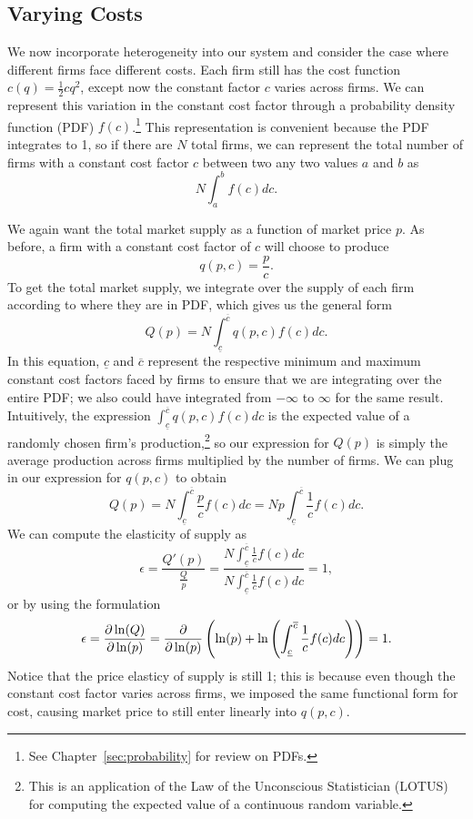 \subsection*{Varying Costs}
We now incorporate heterogeneity into our system and consider the case where different firms face different costs. Each firm still has the cost function $c(q) = \frac{1}{2}cq^2$, except now the constant factor $c$ varies across firms. We can represent this variation in the constant cost factor through a probability density function (PDF) $f(c)$.\footnote{See Chapter~\ref{sec:probability} for review on PDFs.} This representation is convenient because the PDF integrates to 1, so if there are $N$ total firms, we can represent the total number of firms with a constant cost factor $c$ between two any two values $a$ and $b$ as
$$N\int_a^b f(c)dc.$$

We again want the total market supply as a function of market price $p$. As before, a firm with a constant cost factor of $c$ will choose to produce
$$q(p, c) = \frac{p}{c}.$$
To get the total market supply, we integrate over the supply of each firm according to where they are in PDF, which gives us the general form 
$$Q(p) = N\int_{\underline{c}}^{\overline{c}} q(p, c)f(c)dc.$$
In this equation, $\underline{c}$ and $\overline{c}$ represent the respective minimum and maximum constant cost factors faced by firms to ensure that we are integrating over the entire PDF; we also could have integrated from $-\infty$ to $\infty$ for the same result. Intuitively, the expression $\int_{\underline{c}}^{\overline{c}} q(p, c)f(c)dc$ is the expected value of a randomly chosen firm's production,\footnote{This is an application of the Law of the Unconscious Statistician (LOTUS) for computing the expected value of a continuous random variable.} 
so our expression for $Q(p)$ is simply the average production across firms multiplied by the number of firms. We can plug in our expression for $q(p, c)$ to obtain 
$$Q(p) = N\int_{\underline{c}}^{\overline{c}} \frac{p}{c}f(c)dc = Np\int_{\underline{c}}^{\overline{c}} \frac{1}{c}f(c)dc.$$
We can compute the elasticity of supply as 
$$\epsilon = \frac{Q'(p)}{\frac{Q}{p}} = \frac{N\int_{\underline{c}}^{\overline{c}} \frac{1}{c}f(c)dc}{N\int_{\underline{c}}^{\overline{c}} \frac{1}{c}f(c)dc} = 1,$$
or by using the formulation
$$\epsilon = \pdv{\ln(Q)}{\ln(p)} = \pdv{}{\ln(p)}\left(\ln(p) + \ln\left(\int_{\underline{c}}^{\overline{c}} \frac{1}{c}f(c)dc\right)\right) = 1.$$
Notice that the price elasticy of supply is still 1; this is because even though the constant cost factor varies across firms, we imposed the same functional form for cost, causing market price to still enter linearly into $q(p, c)$.

